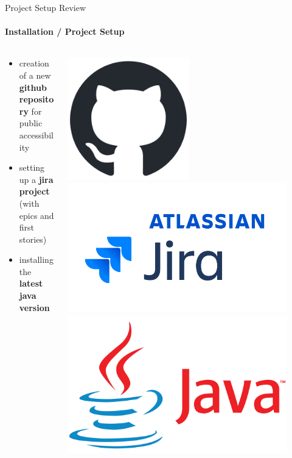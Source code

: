 \documentclass[
ngerman,%
authorontitle=true,
]{bfhbeamer}
\begin{document}
	\begin{frame}{Project Setup Review}
		\framesubtitle{Installation / Project Setup}
		\begin{columns} %
			\begin{column}{0.7\textwidth} %
				\begin{itemize}
					\item creation of a new \textbf{github repository} for public accessibility
					\item setting up a \textbf{jira project} (with epics and first stories)
					\item installing the \textbf{latest java version}
				\end{itemize}
			\end{column}
			\begin{column}{0.23\textwidth} %
				\begin{center}
					\includegraphics[width=0.5\textwidth]{pictures/github-mark.png}
					\includegraphics[width=0.9\textwidth]{pictures/jira_logo.png}
					\includegraphics[width=0.9\textwidth]{pictures/Java-Logo.png}

\end{center}
\end{column}
\end{columns}
\end{frame}
\end{document}
